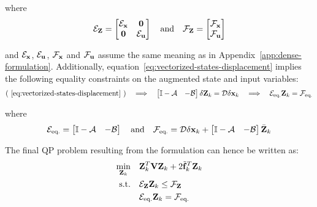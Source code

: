 \documentclass[../main.tex]{subfiles}
\begin{document}
where
\begin{equation*}
	\mathcal{E}_{\mathbf{Z}} = \begin{bmatrix}
		\mathcal{E}_{\mathbf{x}} & \mathbf{0}\\
		\mathbf{0} & \mathcal{E}_{\mathbf{u}}
	\end{bmatrix}
	\quad \text{and} \quad
	\mathcal{F}_{\mathbf{Z}} = \begin{bmatrix}
		\mathcal{F}_{\mathbf{x}}\\
		\mathcal{F}_{\mathbf{u}}
	\end{bmatrix}
\end{equation*}

and $\mathcal{E}_{\mathbf{x}}$, $\mathcal{E}_{\mathbf{u}}$, $\mathcal{F}_{\mathbf{x}}$ and
$\mathcal{F}_{\mathbf{u}}$
assume the same meaning as in Appendix~\ref{app:dense-formulation}.
Additionally, equation~\ref{eq:vectorized-states-displacement} implies the
following equality constraints on the augmented state and input variables:
\begin{equation*}
	(~\ref{eq:vectorized-states-displacement}~) 
	\quad \Longrightarrow \quad
	\begin{bmatrix}
		\mathbb{I} - \mathcal{A} & -\mathcal{B}
	\end{bmatrix}
	\delta \mathbf{Z}_k = \mathcal{D} \delta \mathbf{x}_k
	\quad \Longrightarrow \quad
	\mathcal{E}_{\text{eq.}} \mathbf{Z}_k = \mathcal{F}_{\text{eq.}}
\end{equation*}

where
\begin{equation*}
	\mathcal{E}_{\text{eq.}} = \begin{bmatrix}
		\mathbb{I} - \mathcal{A} & -\mathcal{B}
	\end{bmatrix}
	\quad \text{and} \quad
	\mathcal{F}_{\text{eq.}} = \mathcal{D} \delta \mathbf{x}_k + \begin{bmatrix}
		\mathbb{I} - \mathcal{A} & -\mathcal{B}
\end{bmatrix} \bar{\mathbf{Z}}_k
\end{equation*}

The final QP problem resulting from the  formulation can hence be
written as:
\begin{equation}
	\begin{aligned}
		\min_{\mathbf{Z}_k} \quad & \mathbf{Z}_k^T \mathbf{V} \mathbf{Z}_k + 2
		\tilde{\mathbf{f}}_k^T
		\mathbf{Z}_k\\
		\text{s.t.} \quad & \mathcal{E}_{\mathbf{Z}} \mathbf{Z}_k \leq \mathcal{F}_{\mathbf{Z}}\\
		& \mathcal{E}_{\text{eq.}} \mathbf{Z}_k = \mathcal{F}_{\text{eq.}}
	\end{aligned}
\end{equation}
\end{document}
